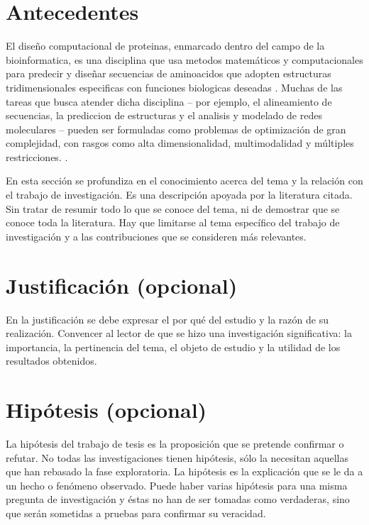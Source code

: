 \section{Antecedentes}\label{secc:antece}

El diseño computacional de proteinas, enmarcado dentro del campo de la bioinformatica, es una disciplina que usa metodos matemáticos y computacionales para predecir y diseñar secuencias de aminoacidos que adopten estructuras tridimensionales especificas con funciones biologicas deseadas \citep{Huang2016}. Muchas de las tareas que busca atender dicha disciplina -- por ejemplo, el alineamiento de secuencias, la prediccion de estructuras y el analisis y modelado de redes moleculares -- pueden ser formuladas como problemas de optimización de gran complejidad, con rasgos como alta dimensionalidad, multimodalidad y múltiples restricciones. \citep{Zhang2009}.


En esta sección se profundiza en el conocimiento acerca del tema y la relación con el trabajo de investigación. Es una descripción apoyada por la literatura citada. Sin tratar de resumir todo lo que se conoce del tema, ni de demostrar que se conoce toda la literatura. Hay que limitarse al tema específico del trabajo de investigación y a las contribuciones que se consideren más relevantes.
\citep{CorderoEsquivel1988}
\section{Justificaci\'on (opcional)}\label{secc:jus}

En la justificación se debe expresar el por qué del estudio y la razón de su realización. Convencer al lector de que se hizo una investigación significativa: la importancia, la pertinencia del tema, el objeto de estudio y la utilidad de los resultados obtenidos.

\section{Hip\'otesis (opcional)}\label{secc:hipot}
La hipótesis del trabajo de tesis es la proposición que se pretende confirmar o refutar. No todas las investigaciones tienen hipótesis, sólo la necesitan aquellas que han rebasado la fase exploratoria. La hipótesis es la explicación que se le da a un hecho o fenómeno observado. Puede haber varias hipótesis para una misma pregunta de investigación y éstas no han de ser tomadas como verdaderas, sino que serán sometidas a pruebas para confirmar su veracidad.

